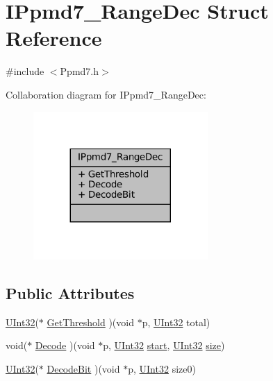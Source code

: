 \hypertarget{struct_i_ppmd7___range_dec}{}\section{I\+Ppmd7\+\_\+\+Range\+Dec Struct Reference}
\label{struct_i_ppmd7___range_dec}


{\ttfamily \#include $<$Ppmd7.\+h$>$}



Collaboration diagram for I\+Ppmd7\+\_\+\+Range\+Dec\+:
\nopagebreak
\begin{figure}[H]
\begin{center}
\leavevmode
\includegraphics[width=188pt]{struct_i_ppmd7___range_dec__coll__graph}
\end{center}
\end{figure}
\subsection*{Public Attributes}
\begin{DoxyCompactItemize}
\item 
\mbox{\hyperlink{7z_types_8h_a4cd0dc7d33ac7a69204e8429ecea0f86}{U\+Int32}}($\ast$ \mbox{\hyperlink{struct_i_ppmd7___range_dec_ab77e257cd8bf249a96a1dfaa2ddfd341}{Get\+Threshold}} )(void $\ast$p, \mbox{\hyperlink{7z_types_8h_a4cd0dc7d33ac7a69204e8429ecea0f86}{U\+Int32}} total)
\item 
void($\ast$ \mbox{\hyperlink{struct_i_ppmd7___range_dec_a13592ecebdba36f037c80f30dfc32fa8}{Decode}} )(void $\ast$p, \mbox{\hyperlink{7z_types_8h_a4cd0dc7d33ac7a69204e8429ecea0f86}{U\+Int32}} \mbox{\hyperlink{tarith_8c_a7b8af9b9d992acd1d81caf9bb377f6c2a0e97c69c73117f6c0109b2d7d1d9cedc}{start}}, \mbox{\hyperlink{7z_types_8h_a4cd0dc7d33ac7a69204e8429ecea0f86}{U\+Int32}} \mbox{\hyperlink{ioapi_8h_a014d89bd76f74ef3a29c8f04b473eb76}{size}})
\item 
\mbox{\hyperlink{7z_types_8h_a4cd0dc7d33ac7a69204e8429ecea0f86}{U\+Int32}}($\ast$ \mbox{\hyperlink{struct_i_ppmd7___range_dec_a7878283025da7a71f5de9ce182e80b52}{Decode\+Bit}} )(void $\ast$p, \mbox{\hyperlink{7z_types_8h_a4cd0dc7d33ac7a69204e8429ecea0f86}{U\+Int32}} size0)
\end{DoxyCompactItemize}


